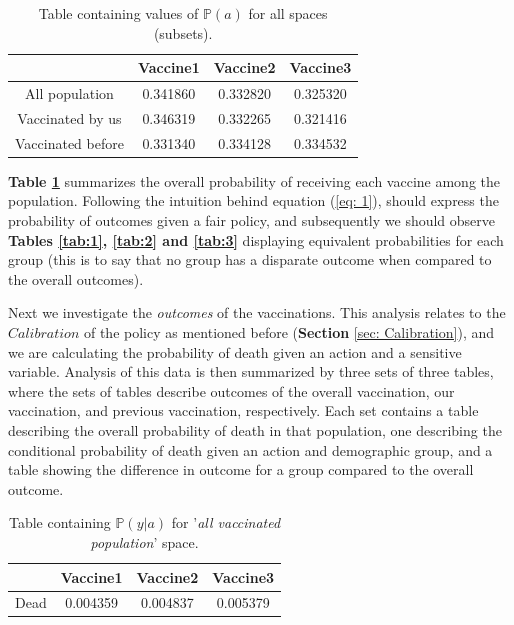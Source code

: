 \documentclass{article}
\begin{document}
\begin{center}
    \begin{table}[H]
    \centering
        \begin{tabular}{ |c| c c c|}
            \hline
            & Vaccine1 &  Vaccine2 & Vaccine3  \\
            \hline
            All population & 0.341860 &  0.332820 &  0.325320 \\
            Vaccinated by us  &  0.346319 &  0.332265 &  0.321416 \\
            Vaccinated before &  0.331340 &  0.334128 &  0.334532
            \\ \hline
        \end{tabular}
    \caption{Table containing values of $\mathbb{P}(a)$ for all spaces (subsets).}
    \label{tab:Pa_summary}
    \end{table}    
\end{center}

\textbf{Table \ref{tab:Pa_summary}} summarizes the overall probability of receiving each vaccine among the population. Following the intuition behind equation (\ref{eq: 1}),  should express the probability of outcomes given a fair policy, and subsequently we should observe \textbf{Tables \ref{tab:1}, \ref{tab:2} and \ref{tab:3}} displaying equivalent probabilities for each group (this is to say that no group has a disparate outcome when compared to the overall outcomes).

Next we investigate the \textit{outcomes} of the vaccinations. This analysis relates to the $Calibration$ of the policy as mentioned before (\textbf{Section} \ref{sec: Calibration}), and we are calculating the probability of death given an action and a sensitive variable. Analysis of this data is then summarized by three sets of three tables, where the sets of tables describe outcomes of the overall vaccination, our vaccination, and previous vaccination, respectively. Each set contains a table describing the overall probability of death in that population, one describing the conditional probability of death given an action and demographic group, and a table showing the difference in outcome for a group compared to the overall outcome.

\begin{center}
    \begin{table}[H]
    \centering
        \begin{tabular}{ |c| c c c|}
            \hline
            & Vaccine1 &  Vaccine2 & Vaccine3  \\
            \hline
            Dead &  0.004359 &  0.004837 &  0.005379
            \\ \hline
        \end{tabular}
    \caption{Table containing $\mathbb{P}(y | a)$ for '\textit{all vaccinated population}' space.}
    \label{tab:simple_prob_py_a}
    \end{table}
\end{center}
\end{document}
